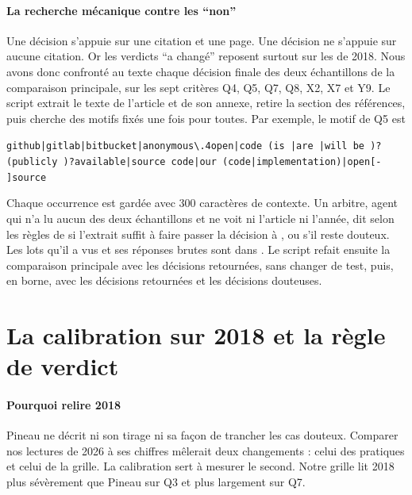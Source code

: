 \paragraph{La recherche mécanique contre les \enquote{non}}
Une décision  s'appuie sur une citation et une page. Une décision  ne s'appuie
sur aucune citation. Or les verdicts \enquote{a changé} reposent surtout sur les  de 2018.
Nous avons donc confronté au texte chaque décision finale  des deux échantillons de la comparaison principale, sur les sept critères Q4, Q5, Q7,
Q8, X2, X7 et Y9. Le script  extrait le texte de l'article et de son annexe,
retire la section des références, puis cherche des motifs fixés une fois pour toutes. Par exemple, le motif de Q5 est
\begin{center}
\small\verb!github|gitlab|bitbucket|anonymous\.4open|code (is |are |will be )?!\\
\small\verb!(publicly )?available|source code|our (code|implementation)|open[- ]source!
\end{center}
Chaque occurrence est gardée avec 300 caractères de contexte. Un arbitre, agent qui n'a lu aucun des
deux échantillons et ne voit ni l'article ni l'année, dit selon les règles de  si
l'extrait suffit à faire passer la décision à , ou s'il reste douteux. Les lots qu'il a vus et
ses réponses brutes sont dans . Le script 
refait ensuite la comparaison principale avec les décisions retournées, sans changer de test, puis,
en borne, avec les décisions retournées et les décisions douteuses.

\section{La calibration sur 2018 et la règle de verdict}\label{sec:sm-verdict}

\paragraph{Pourquoi relire 2018}
Pineau ne décrit ni son tirage ni sa façon de trancher les cas douteux. Comparer nos lectures de 2026
à ses chiffres mêlerait deux changements : celui des pratiques et celui de la grille. La calibration
sert à mesurer le second. Notre grille lit 2018 plus sévèrement que Pineau sur Q3 et plus largement
sur Q7.

